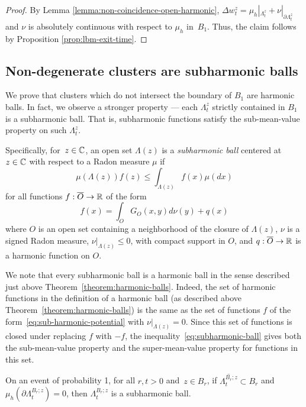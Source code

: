 \documentclass[12pt]{amsart}
\numberwithin{equation}{section}
\newcommand{\lss}[2]{\hyperref[eq:least-super-solution]{w^{#1}_{#2}}}
\newcommand{\cluster}[2]{\hyperref[eq:non-co-set]{\mathit{\Lambda}^{#1}_{#2}}}
\begin{document}
	\begin{proof}
		By Lemma \ref{lemma:non-coincidence-open-harmonic}, $\Delta \lss{z}{t} = \mu_h |_{{{\cluster{z}{t}}}} + \nu |_{\partial {\cluster{z}{t}}}$
		and $\nu$ is absolutely continuous with respect to $\mu_h$ in~$B_1$. Thus, the claim follows by Proposition  \ref{prop:lbm-exit-time}.
	\end{proof}
	
	\subsection{Non-degenerate clusters are subharmonic balls} \label{subsec:subharmonic}
	We prove that clusters which do not intersect the boundary of $B_1$ are harmonic balls. 
	In fact, we observe a stronger property --- each ${\cluster{z}{t}}$ strictly contained in $B_1$ 
	is a subharmonic ball. That is, subharmonic functions satisfy the sub-mean-value property 
	on such ${\cluster{z}{t}}$.
	
	Specifically, for~$z \in \mathbb{C}$, an open set $\Lambda(z)$ is a {\it subharmonic ball} centered at~$z \in \mathbb{C}$  with respect to a Radon measure $\mu$ if 
	\begin{equation} \label{eq:subharmonic-ball}
	\mu(\Lambda(z)) f(z)  \leq \int_{\Lambda(z)} f(x) \mu(d x)
	\end{equation}
	for all functions $f: \overline{O} \to \mathbb{R}$ of the form
	\begin{equation} \label{eq:sub-harmonic-potential}
	f(x) = \int_{O} G_{O}(x,y) d \nu(y) + q(x)
	\end{equation}
	where $O$ is an open set containing a neighborhood of the closure of $\Lambda(z)$,
	$\nu$ is a signed Radon measure, $\nu |_{\Lambda(z)} \leq 0$, with compact support in $O$,
	and $q:\overline{O} \to \mathbb{R}$ is a harmonic function on $O$.
	
	We note that every subharmonic ball is a harmonic ball in the sense described just above Theorem~\ref{theorem:harmonic-balls}. Indeed, the set of harmonic functions in the definition of a harmonic ball (as described above Theorem~\ref{theorem:harmonic-balls}) is the same as the set of functions $f$ of the form~\eqref{eq:sub-harmonic-potential} with $\nu|_{\Lambda(z)}=0$. Since this set of functions is closed under replacing $f$ with $-f$, the inequality~\eqref{eq:subharmonic-ball} gives both the sub-mean-value property and the super-mean-value property for functions in this set.
	
	\begin{lemma} \label{lemma:harmonic-ball}
		On an event of probability 1, for all $r,t > 0$ and~$z \in B_r$, if  $\overline{{{\cluster{B_r;z}{t}}}} \subset B_r$ and $\mu_h(\partial {\cluster{B_r;z}{t}}) = 0$, 
		then ${\cluster{B_r;z}{t}}$ is a subharmonic ball. 
	\end{lemma}
	
\end{document}
